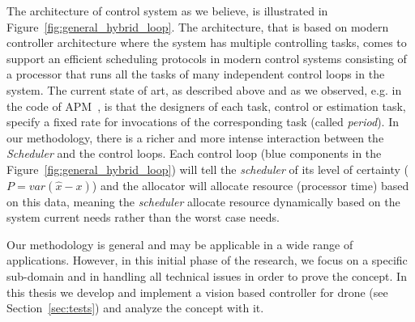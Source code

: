 \documentclass[ twoside, 12pt ]{article}
\begin{document}
{{    %
    The architecture of control system as we believe, is illustrated in Figure~\ref{fig:general_hybrid_loop}.
    The architecture, that is based on modern controller architecture where the system has multiple controlling tasks, comes to support an efficient scheduling protocols in modern control systems consisting of a processor that runs all the tasks of many independent control loops in the system. 
    The current state of art, as described above and as we observed, e.g. in the code of APM~\cite{APM}, is that the designers of each task, control or estimation task, specify a fixed rate for invocations of the corresponding task (called \textit{period}).
    In our methodology, there is a richer and more intense interaction between the \textit{Scheduler} and the control loops. Each control loop (blue components in the Figure~\ref{fig:general_hybrid_loop}) will tell the \textit{scheduler} of its level of certainty ($P = var(\hat{x} - x)$) and the allocator will allocate resource (processor time) based on this data, meaning the \textit{scheduler} allocate resource dynamically based on the system current needs rather than the worst case needs.
    
    Our methodology is general and may be applicable in a wide range of applications. However, in this initial phase of the research, we focus on a specific sub-domain and in handling all technical issues in order to prove the concept.
    In this thesis we develop and implement a vision based controller for drone (see Section~\ref{sec:tests}) and analyze the concept with it.
    
    \begin{figure}[]
        \centering
        
\end{figure}}}
\end{document}
